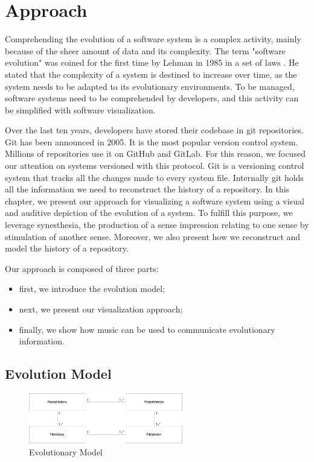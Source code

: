 
\chapter[Approach]{Approach}
\graphicspath{ {images/approach} }

Comprehending the evolution of a software system is a complex activity, mainly because of the sheer amount of data and its complexity. 
The term "software evolution" was coined for the first time by Lehman in 1985 in a set of laws \cite{Lehman1985}.
He stated that the complexity of a system is destined to increase over time, as the system needs to be adapted to its evolutionary environments. 
To be managed, software systems need to be comprehended by developers, and this activity can be simplified with software visualization. 

Over the last ten years, developers have stored their codebase in git repositories. Git has been announced in 2005. It is the most popular version control system. Millions of repositories use it on GitHub and GitLab.
For this reason, we focused our attention on systems versioned with this protocol.
Git is a versioning control system that tracks all the changes made to every system file. 
Internally git holds all the information we need to reconstruct the history of a repository. 
In this chapter, we present our approach for visualizing a software system using a visual and auditive depiction of the evolution of a system. 
To fulfill this purpose, we leverage synesthesia, the production of a sense impression relating to one sense by stimulation of another sense.
Moreover, we also present how we reconstruct and model the history of a repository. 

Our approach is composed of three parts: 
\begin{itemize}
    \item first, we introduce the evolution model; 
    \item next, we present our visualization approach;
    \item finally, we show how music can be used to communicate evolutionary information. 
\end{itemize}


\section{Evolution Model}
\label{s:EvolutionModel}

\begin{figure}[H]
    \begin{center}
        \includegraphics[width=0.6\textwidth]{EvolutionModel.jpg}
    \end{center}
    \caption{Evolutionary Model}
    \label{fig:EvolutionaryModel}
\end{figure}

